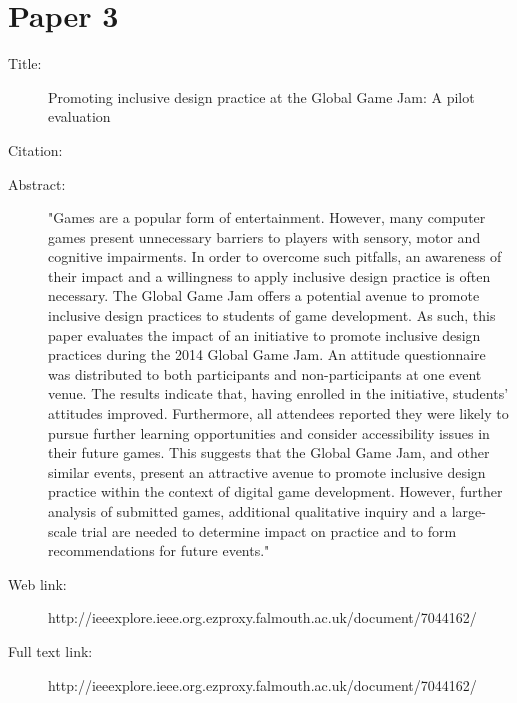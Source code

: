 \documentclass{scrartcl}
\begin{document}
\section*{Paper 3}
\begin{description}
\item[Title:] Promoting inclusive design practice at the Global Game Jam: A pilot evaluation 
\item[Citation:] \cite{Michael}
\item[Abstract:] "Games are a popular form of entertainment. However, many computer games present unnecessary barriers to players with sensory, motor and cognitive impairments. In order to overcome such pitfalls, an awareness of their impact and a willingness to apply inclusive design practice is often necessary. The Global Game Jam offers a potential avenue to promote inclusive design practices to students of game development. As such, this paper evaluates the impact of an initiative to promote inclusive design practices during the 2014 Global Game Jam. An attitude questionnaire was distributed to both participants and non-participants at one event venue. The results indicate that, having enrolled in the initiative, students' attitudes improved. Furthermore, all attendees reported they were likely to pursue further learning opportunities and consider accessibility issues in their future games. This suggests that the Global Game Jam, and other similar events, present an attractive avenue to promote inclusive design practice within the context of digital game development. However, further analysis of submitted games, additional qualitative inquiry and a large-scale trial are needed to determine impact on practice and to form recommendations for future events." 
\item[Web link:] http://ieeexplore.ieee.org.ezproxy.falmouth.ac.uk/document/7044162/ 
\item[Full text link:] http://ieeexplore.ieee.org.ezproxy.falmouth.ac.uk/document/7044162/
\end{description}



\end{document}
